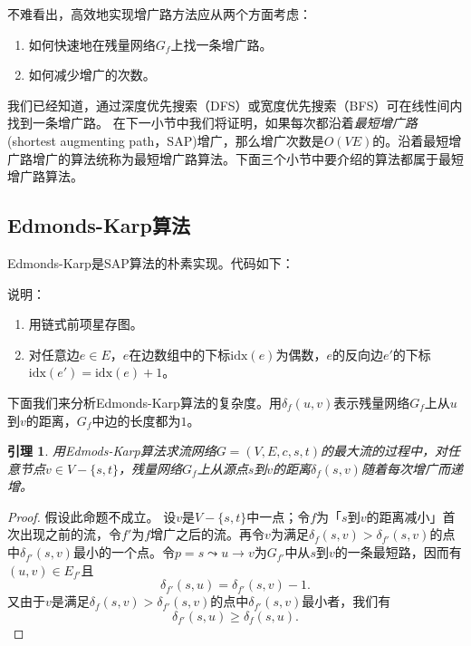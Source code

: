 \documentclass[fontset=ubuntu]{ctexbook}
\newtheorem{lemma}{引理}
\newcommand{\idx}{\mathrm{idx}}
\begin{document}
    不难看出，高效地实现增广路方法应从两个方面考虑：
    \begin{enumerate}
        \item 如何快速地在残量网络$G_f$上找一条增广路。\label{Approach:1}
        \item 如何减少增广的次数。\label{Approach:2}
    \end{enumerate}
    我们已经知道，通过深度优先搜索（DFS）或宽度优先搜索（BFS）可在线性间内找到一条增广路。
    在下一小节中我们将证明，如果每次都沿着\emph{最短增广路}(shortest augmenting path，SAP)增广，那么增广次数是$O(VE)$的。沿着最短增广路增广的算法统称为最短增广路算法。下面三个小节中要介绍的算法都属于最短增广路算法。
    \subsection{Edmonds-Karp算法}
    Edmonds-Karp是SAP算法的朴素实现。代码如下：
    
    说明：
    \begin{enumerate}
        \item 用链式前项星存图。
        \item 对任意边$e \in E$，$e$在边数组中的下标$\idx(e)$为偶数，$e$的反向边$e'$的下标$\idx(e') = \idx(e) + 1$。
    \end{enumerate}

    下面我们来分析Edmonds-Karp算法的复杂度。用$\delta_f(u,v)$表示残量网络$G_f$上从$u$到$v$的距离，$G_f$中边的长度都为$1$。
    \begin{lemma}
        用Edmods-Karp算法求流网络$G=(V,E,c,s,t)$的最大流的过程中，对任意节点$v\in V-\{s,t\}$，残量网络$G_f$上从源点$s$到$v$的距离$\delta_f(s,v)$随着每次增广而递增。
    \end{lemma}
    \begin{proof}
        假设此命题不成立。
        设$v$是$V-\{s,t\}$中一点；令$f$为「$s$到$v$的距离减小」首次出现之前的流，令$f'$为$f$增广之后的流。再令$v$为满足$\delta_f(s,v)>\delta_{f'}(s,v)$的点中$\delta_{f'}(s,v)$最小的一个点。令$p = s \leadsto u\to v$为$G_{f'}$中从$s$到$v$的一条最短路，因而有$(u,v)\in E_{f'}$且
        \begin{equation}
            \delta_{f'}(s,u) = \delta_{f'}(s,v) - 1 .
        \end{equation}
        又由于$v$是满足$\delta_f(s,v)>\delta_{f'}(s,v)$的点中$\delta_{f'}(s,v)$最小者，我们有
        \begin{equation}
            \delta_{f'}(s,u)\ge\delta_f(s,u).
        \end{equation}
    \end{proof}
\end{document}
